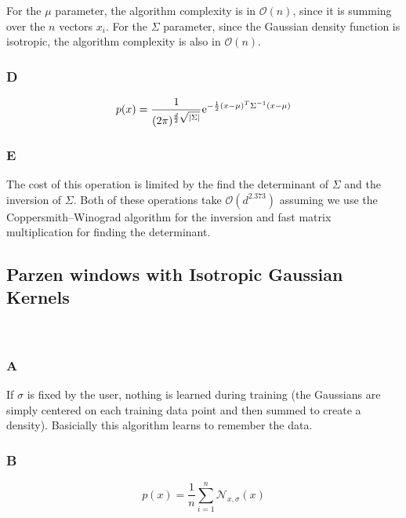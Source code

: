 \documentclass{amsart}
\theoremstyle{definition}
\theoremstyle{remark}
\numberwithin{equation}{section}
\begin{document}
For the $\mathcal{\mu}$ parameter, the algorithm complexity is in 
$\mathcal{O}(n)$, since it is summing over the $n$ vectors $x_{i}$. For 
the $\Sigma$ parameter, since the Gaussian density function is isotropic, the 
algorithm complexity is also in $\mathcal{O}(n)$. 


\subsubsection{D} 

\begin{equation}
    p(x) = \frac{1}{(2\pi)^{\frac{d}{2} \sqrt{|\Sigma|}}} {\rm e}^{-\frac{1}{2}(x-\mu)^T \Sigma^{-1} (x-\mu)}   
\end{equation}
 
\subsubsection{E} 

The cost of this operation is limited by the find the determinant of $\Sigma$
and the inversion of $\Sigma$. Both of these operations take $\mathcal{O}(d^{2.373})$  
assuming we use the Coppersmith–Winograd algorithm for the inversion and fast
matrix multiplication for finding the determinant. \\

\subsection{Parzen windows with Isotropic Gaussian Kernels} \\

\subsubsection{A} 

 If $\sigma$ is fixed by the user, nothing is learned during training (the 
Gaussians are simply centered on each training data point and then summed to 
create a density). Basicially this algorithm learns to remember the data. \\

\subsubsection{B} 

\begin{equation}
    p(x) = \frac{1}{n}\sum_{i=1}^{n}\mathcal{N}_{x, \sigma}(x)
\end{equation}
\end{document}
